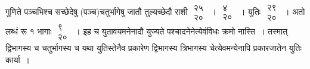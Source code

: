 \documentclass[10pt, openany]{book}
\begin{document}
{गुणिते पञ्चभिश्च सच्छेदेषु (पञ्च)चतुर्भागेषु जातौ तुल्यच्छेदौ राशी $\begin{matrix}

\mbox{{२५}}\\

\mbox{{२०}}

\end{matrix}$~। $\begin{matrix}

\mbox{{४}}\\

\mbox{{२०}}

\end{matrix}$~। युतिः $\begin{matrix}

\mbox{{२९}}\\

\mbox{{२०}}

\end{matrix}$~। अतो लब्धं रू १ भागाः $\begin{matrix}

\mbox{{९}}\\

\mbox{{२०}}

\end{matrix}$~। इह च युतावयमनेनादौ युज्यते
पश्चादनेनेत्येवंविधः क्रमो}
{नास्ति~। तस्मात् द्विभागस्य च चतुर्भागस्य च यथा युतिस्तेनैव प्रकारेण
द्विभागस्य}
{त्रिभागस्य चेत्येवमन्येनापि प्रकारजातेन युतिः कार्या~।}
\vspace{3mm}
\end{document}
